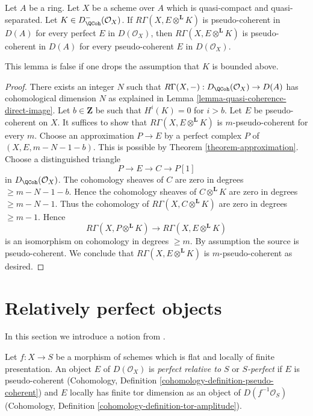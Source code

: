 \begin{lemma}
\label{lemma-perfect-enough}
Let $A$ be a ring. Let $X$ be a scheme over $A$ which is quasi-compact
and quasi-separated. Let $K \in D^-_\QCoh(\mathcal{O}_X)$.
If $R\Gamma(X, E \otimes^\mathbf{L} K)$ is pseudo-coherent
in $D(A)$ for every perfect $E$ in $D(\mathcal{O}_X)$,
then $R\Gamma(X, E \otimes^\mathbf{L} K)$ is pseudo-coherent
in $D(A)$ for every pseudo-coherent $E$ in $D(\mathcal{O}_X)$.
\end{lemma}

\noindent
This lemma is false if one drops the assumption that $K$
is bounded above.

\begin{proof}
There exists an integer $N$ such that
$R\Gamma(X, -) : D_\QCoh(\mathcal{O}_X) \to D(A)$
has cohomological dimension $N$ as explained in
Lemma \ref{lemma-quasi-coherence-direct-image}.
Let $b \in \mathbf{Z}$ be such that $H^i(K) = 0$ for $i > b$.
Let $E$ be pseudo-coherent on $X$.
It suffices to show that $R\Gamma(X, E \otimes^\mathbf{L} K)$
is $m$-pseudo-coherent for every $m$.
Choose an approximation $P \to E$ by a perfect complex $P$
of $(X, E, m - N - 1 - b)$. This is possible by
Theorem \ref{theorem-approximation}.
Choose a distinguished triangle
$$
P \to E \to C \to P[1]
$$
in $D_\QCoh(\mathcal{O}_X)$. The cohomology sheaves of $C$ are zero
in degrees $\geq m - N - 1 - b$. Hence the cohomology
sheaves of $C \otimes^\mathbf{L} K$ are zero in degrees $\geq m - N - 1$.
Thus the cohomology of $R\Gamma(X, C \otimes^\mathbf{L} K)$
are zero in degrees $\geq m - 1$. Hence
$$
R\Gamma(X, P \otimes^\mathbf{L} K) \to R\Gamma(X, E \otimes^\mathbf{L} K)
$$
is an isomorphism on cohomology in degrees $\geq m$.
By assumption the source is pseudo-coherent.
We conclude that $R\Gamma(X, E \otimes^\mathbf{L} K)$
is $m$-pseudo-coherent as desired.
\end{proof}









\section{Relatively perfect objects}
\label{section-relatively-perfect}

\noindent
In this section we introduce a notion from
\cite{lieblich-complexes}.

\begin{definition}
\label{definition-relatively-perfect}
Let $f : X \to S$ be a morphism of schemes which is flat and
locally of finite presentation. An object $E$ of $D(\mathcal{O}_X)$ is
{\it perfect relative to $S$} or
{\it $S$-perfect} if $E$ is pseudo-coherent
(Cohomology, Definition \ref{cohomology-definition-pseudo-coherent}) and
$E$ locally has finite tor dimension as an object of
$D(f^{-1}\mathcal{O}_S)$
(Cohomology, Definition \ref{cohomology-definition-tor-amplitude}).
\end{definition}


